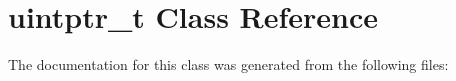 \hypertarget{classuintptr__t}{}\section{uintptr\+\_\+t Class Reference}
\label{classuintptr__t}


The documentation for this class was generated from the following files\+: